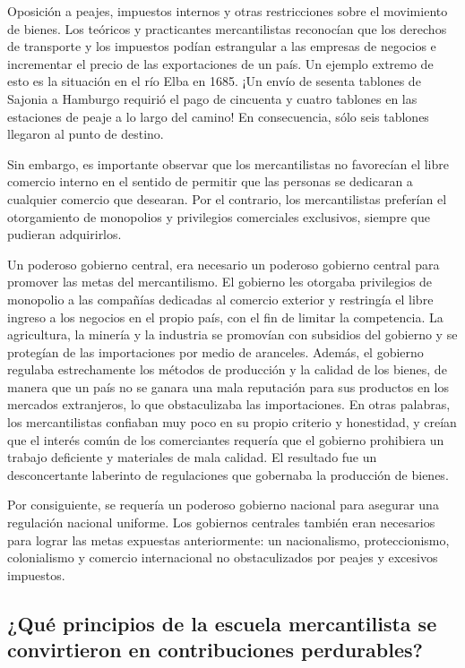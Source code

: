\documentclass[
  jou,
  floatsintext,
  longtable,
  a4paper,
  nolmodern,
  notxfonts,
  notimes,
  colorlinks=true,linkcolor=blue,citecolor=blue,urlcolor=blue]{apa7}
\begin{document}
Oposición a peajes, impuestos internos y otras restricciones sobre el
movimiento de bienes. Los teóricos y practicantes mercantilistas
reconocían que los derechos de transporte y los impuestos podían
estrangular a las empresas de negocios e incrementar el precio de las
exportaciones de un país. Un ejemplo extremo de esto es la situación en
el río Elba en 1685. ¡Un envío de sesenta tablones de Sajonia a Hamburgo
requirió el pago de cincuenta y cuatro tablones en las estaciones de
peaje a lo largo del camino! En consecuencia, sólo seis tablones
llegaron al punto de destino.

Sin embargo, es importante observar que los mercantilistas no favorecían
el libre comercio interno en el sentido de permitir que las personas se
dedicaran a cualquier comercio que desearan. Por el contrario, los
mercantilistas preferían el otorgamiento de monopolios y privilegios
comerciales exclusivos, siempre que pudieran adquirirlos.

Un poderoso gobierno central, era necesario un poderoso gobierno central
para promover las metas del mercantilismo. El gobierno les otorgaba
privilegios de monopolio a las compañías dedicadas al comercio exterior
y restringía el libre ingreso a los negocios en el propio país, con el
fin de limitar la competencia. La agricultura, la minería y la industria
se promovían con subsidios del gobierno y se protegían de las
importaciones por medio de aranceles. Además, el gobierno regulaba
estrechamente los métodos de producción y la calidad de los bienes, de
manera que un país no se ganara una mala reputación para sus productos
en los mercados extranjeros, lo que obstaculizaba las importaciones. En
otras palabras, los mercantilistas confiaban muy poco en su propio
criterio y honestidad, y creían que el interés común de los comerciantes
requería que el gobierno prohibiera un trabajo deficiente y materiales
de mala calidad. El resultado fue un desconcertante laberinto de
regulaciones que gobernaba la producción de bienes.

Por consiguiente, se requería un poderoso gobierno nacional para
asegurar una regulación nacional uniforme. Los gobiernos centrales
también eran necesarios para lograr las metas expuestas anteriormente:
un nacionalismo, proteccionismo, colonialismo y comercio internacional
no obstaculizados por peajes y excesivos impuestos.

\subsection{¿Qué principios de la escuela mercantilista se convirtieron
en contribuciones
perdurables?}\label{quuxe9-principios-de-la-escuela-mercantilista-se-convirtieron-en-contribuciones-perdurables}
\end{document}
